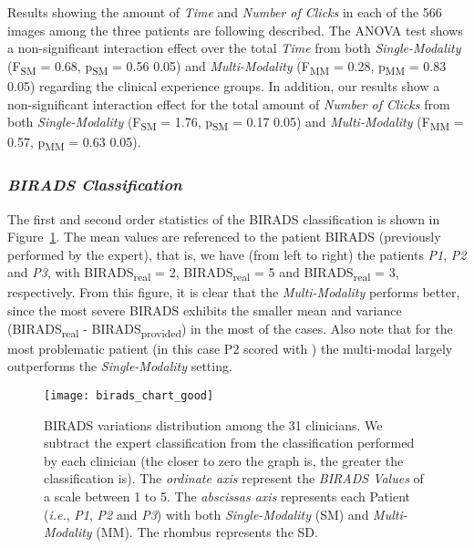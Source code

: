 Results showing the amount of \textit{Time} and \textit{Number of Clicks} in each of the 566 images among the three patients are following described.
The ANOVA test shows a non-significant interaction effect over the total \textit{Time} from both \textit{Single-Modality} (F\textsubscript{SM} = 0.68, p\textsubscript{SM} = 0.56  0.05) and \textit{Multi-Modality} (F\textsubscript{MM} = 0.28, p\textsubscript{MM} = 0.83  0.05) regarding the clinical experience groups.
In addition, our results show a non-significant interaction effect for the total amount of \textit{Number of Clicks} from both \textit{Single-Modality} (F\textsubscript{SM} = 1.76, p\textsubscript{SM} = 0.17  0.05) and \textit{Multi-Modality} (F\textsubscript{MM} = 0.57, p\textsubscript{MM} = 0.63  0.05).

\subsubsection{\textit{BIRADS Classification}}

The first and second order statistics of the BIRADS classification is shown in Figure~\ref{fig:birads_chart}.
The mean values are referenced to the patient BIRADS (previously performed by the expert), that is, we have (from left to right) the patients \textit{P1}, \textit{P2} and \textit{P3}, with BIRADS\textsubscript{real} = 2, BIRADS\textsubscript{real} = 5 and BIRADS\textsubscript{real} = 3, respectively.
From this figure, it is clear that the \textit{Multi-Modality} performs better, since the most severe BIRADS exhibits the smaller mean and variance (BIRADS\textsubscript{real} - BIRADS\textsubscript{provided}) in the most of the cases. Also note that for the most problematic patient (in this case P2 scored with ) the multi-modal largely outperforms the \textit{Single-Modality} setting.

\begin{figure}[ht]
\centering
\texttt{[image: birads\_chart\_good]}
\caption{\scriptsize BIRADS variations distribution among the 31 clinicians.
We subtract the expert classification from the classification performed by each clinician
(the closer to zero the graph is, the greater the classification is). The \textit{ordinate axis} represent the \textit{BIRADS Values} of a scale between 1 to 5.
The \textit{abscissas axis} represents each Patient ({\em i.e.}, \textit{P1}, \textit{P2} and \textit{P3}) with both \textit{Single-Modality} (SM) and \textit{Multi-Modality} (MM).
The rhombus represents the SD.}
\label{fig:birads_chart}
\end{figure}



